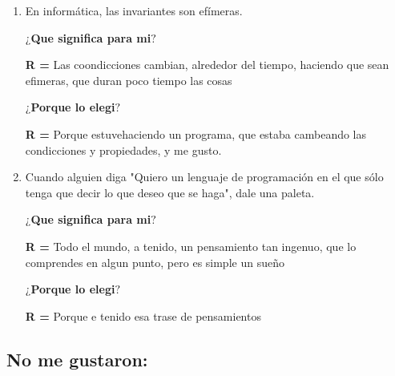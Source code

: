 \documentclass[letterpaper,12pt]{article}
\begin{document}
\begin{enumerate}
\item En informática, las invariantes son efímeras.\par
\textbf{$¿$Que significa para mi$?$}\par
\textbf{R =} \text Las coondicciones cambian, alrededor del tiempo, haciendo que sean efimeras, que duran poco tiempo las cosas\par
\textbf{$¿$Porque lo elegi$?$}\par
\textbf{R =} \text Porque estuvehaciendo un programa, que estaba cambeando las condicciones y propiedades, y me gusto.

\item Cuando alguien diga "Quiero un lenguaje de programación en el que sólo tenga que decir lo que deseo que se haga", dale una paleta.\par
\textbf{$¿$Que significa para mi$?$}\par
\textbf{R =} \text Todo el mundo, a tenido, un pensamiento tan ingenuo, que lo comprendes en algun punto, pero es simple un sueño\par
\textbf{$¿$Porque lo elegi$?$}\par
\textbf{R =} \text Porque e tenido esa trase de pensamientos
\end{enumerate}

\newpage

\subsection* {No me gustaron: }
\end{document}
